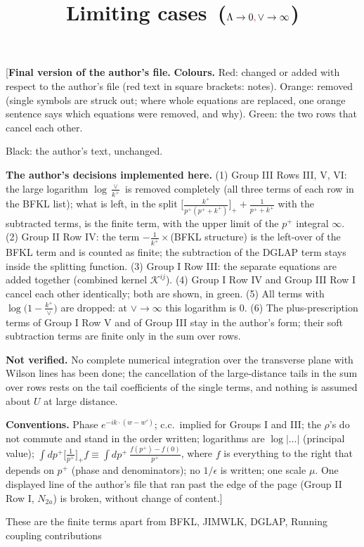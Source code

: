 \documentclass[9pt]{article}
\title{Limiting cases\, ($\Lambda\to 0{\color{red},}\, \vee \to \infty$)}
\author{}
\date{}
\numberwithin{equation}{section}
\begin{document}
\maketitle
{\color{red}\noindent[\textbf{Final version of the author's file.} \textbf{Colours.} Red: changed or added with respect to the author's file (red text in square brackets: notes).} {\color{orange}Orange: removed (single symbols are struck out; where whole equations are replaced, one orange sentence says which equations were removed, and why).} {\color{green!50!black}Green: the two rows that cancel each other.} {\color{red}Black: the author's text, unchanged.\par\noindent\textbf{The author's decisions implemented here.} (1) Group III Rows III, V, VI: the large logarithm $\log\frac{\vee}{k^{+}}$ is removed completely (all three terms of each row in the BFKL list); what is left, in the split $\big[\frac{k^{+}}{p^{+}(p^{+}+k^{+})}\big]_{+}+\frac{1}{p^{+}+k^{+}}$ with the subtracted terms, is the finite term, with the upper limit of the $p^{+}$ integral $\infty$. (2) Group II Row IV: the term $-\frac{1}{k^{+}}\times$(BFKL structure) is the left-over of the BFKL term and is counted as finite; the subtraction of the DGLAP term stays inside the splitting function. (3) Group I Row III: the separate equations are added together (combined kernel $\mathcal{K}^{ij}$). (4) Group I Row IV and Group III Row I cancel each other identically; both are shown, in green. (5) All terms with $\log\big(1-\frac{k^{+}}{\vee}\big)$ are dropped: at $\vee\to\infty$ this logarithm is $0$. (6) The plus-prescription terms of Group I Row V and of Group III stay in the author's form; their soft subtraction terms are finite only in the sum over rows.\par\noindent\textbf{Not verified.} No complete numerical integration over the transverse plane with Wilson lines has been done; the cancellation of the large-distance tails in the sum over rows rests on the tail coefficients of the single terms, and nothing is assumed about $U$ at large distance.\par\noindent\textbf{Conventions.} Phase $e^{-ik\cdot(w-w')}$; c.c.\ implied for Groups I and III; the $\rho$'s do not commute and stand in the order written; logarithms are $\log|\dots|$ (principal value); $\int dp^{+}\big[\frac{1}{p^{+}}\big]_{+}f\equiv\int dp^{+}\,\frac{f(p^{+})-f(0)}{p^{+}}$, where $f$ is everything to the right that depends on $p^{+}$ (phase and denominators); no $1/\epsilon$ is written; one scale $\mu$. One displayed line of the author's file that ran past the edge of the page (Group II Row I, $N_{2a}$) is broken, without change of content.]}\par
These are the finite terms apart from BFKL, JIMWLK, DGLAP, Running coupling contributions
\end{document}
